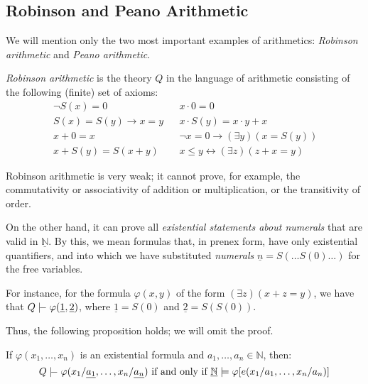 \subsection{Robinson and Peano Arithmetic}

We will mention only the two most important examples of arithmetics: \emph{Robinson arithmetic} and \emph{Peano arithmetic}.

\begin{definition}
\emph{Robinson arithmetic} is the theory $Q$ in the language of arithmetic consisting of the following (finite) set of axioms:
\begin{align*}
    &\neg S(x) = 0& &x \cdot 0 = 0\\
    &S(x) = S(y) \rightarrow x = y& &x \cdot S(y) = x \cdot y + x\\
    &x + 0 = x& &\neg x = 0 \rightarrow (\exists y)(x = S(y))\\
    &x + S(y) = S(x + y)& &x \le y \leftrightarrow (\exists z)(z + x = y)\qquad
\end{align*}
\end{definition}

Robinson arithmetic is very weak; it cannot prove, for example, the commutativity or associativity of addition or multiplication, or the transitivity of order.

On the other hand, it can prove all \emph{existential statements about numerals} that are valid in $\underline{\mathbb{N}}$. By this, we mean formulas that, in prenex form, have only existential quantifiers, and into which we have substituted \emph{numerals} $\underline{n} = S(\dots S(0) \dots)$ for the free variables.

\begin{example}
For instance, for the formula $\varphi(x,y)$ of the form $(\exists z)(x + z = y)$, we have that $Q \proves \varphi(\underline{1}, \underline{2})$, where $\underline{1} = S(0)$ and $\underline{2} = S(S(0))$.    
\end{example}

Thus, the following proposition holds; we will omit the proof.

\begin{proposition}\label{proposition:robinson-satisfies-existence-about-numerals}
    If $\varphi(x_1, \dots, x_n)$ is an existential formula and $a_1, \dots, a_n \in \mathbb{N}$, then:
    $$
    Q \proves \varphi(x_1 / \underline{a_1}, \dots, x_n / \underline{a_n}) \text{ if and only if } \underline{\mathbb{N}} \models \varphi[e(x_1 / a_1, \dots, x_n / a_n)]
    $$
\end{proposition}

